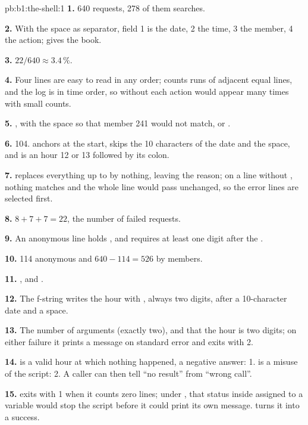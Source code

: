 \begin{solution}{pb:b1:the-shell:1}
\textbf{1.} 640 requests, 278 of them searches.

\textbf{2.} With the space as separator, field 1 is the date, 2 the time, 3 the member, 4 the action;  gives
the book.

\textbf{3.} $22 / 640 \approx 3.4\,\%$.

\textbf{4.} Four lines are easy to read in any order;  counts runs of adjacent equal lines, and the log is
in time order, so without  each action would appear many times with small counts.

\textbf{5.} , with the space so that member 241 would not match, or
.

\textbf{6.} 104. \code{^} anchors at the start,  skips the 10 characters of the date and the space, and
 is an hour 12 or 13 followed by its colon.

\textbf{7.}  replaces everything up to  by nothing, leaving the reason; on a line
without , nothing matches and the whole line would pass unchanged, so the error lines are selected first.

\textbf{8.} $8 + 7 + 7 = 22$, the number of failed requests.

\textbf{9.} An anonymous line holds , and \code{[0-9]+} requires at least one digit after the \code{=}.

\textbf{10.} 114 anonymous and $640 - 114 = 526$ by members.

\textbf{11.} , and .

\textbf{12.} The f-string writes the hour with , always two digits, after a 10-character date and a
space.

\textbf{13.} The number of arguments (exactly two), and that the hour is two digits; on either failure it prints a
message on standard error and exits with 2.

\textbf{14.}  is a valid hour at which nothing happened, a negative answer: 1.  is a misuse of the
script: 2. A caller can then tell ``no result'' from ``wrong call''.

\textbf{15.}  exits with 1 when it counts zero lines; under , that status inside
\code{$( )} assigned to a variable would stop the script before it could print its own message.  turns it
into a success.


\end{solution}
